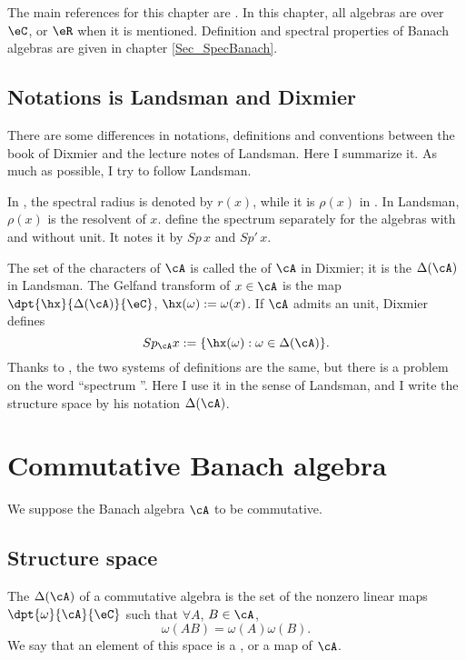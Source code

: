 
The main references for this chapter are \cite{Dixmier,Landsman}. In this chapter, all algebras are over $\eC$, or $\eR$ when it is mentioned. Definition and spectral properties of Banach algebras are given in chapter \ref{Sec_SpecBanach}.

\subsection*{Notations is Landsman and Dixmier}

There are some differences in notations, definitions and conventions between the book of Dixmier and the lecture notes of Landsman. Here I summarize it. As much as possible, I try to follow Landsman.

In , the spectral radius is denoted by $r(x)$, while it is $\rho(x)$ in . In Landsman, $\rho(x)$ is the resolvent of $x$.  define the spectrum separately for the algebras with and without unit. It notes it by $Sp\,x$ and $Sp'\,x$.

The set of the characters of $\cA$ is called the  of $\cA$ in Dixmier; it is the $\Delta(\cA)$ in Landsman. The Gelfand transform of $x\in\cA$ is the map $\dpt{\hx}{\Delta(\cA)}{\eC}$, $\hx(\omega):=\omega(x)$. If $\cA$ admits an unit, Dixmier defines
\[
   Sp_{\cA}x:=\{\hx(\omega):\omega\in\Delta(\cA)\}.
\]
Thanks to , the two systems of definitions are the same, but there is a problem on the word ``spectrum ''. Here I use it in the sense of Landsman, and I write the structure space by his notation $\Delta(\cA)$.

\section{Commutative Banach algebra}

We suppose the Banach algebra $\cA$ to be commutative.

\subsection{Structure space}

\begin{definition}      \label{DefStructureSpaceDel}
    The  $\Delta(\cA)$ of a commutative algebra is the set of the nonzero linear maps $\dpt{\omega}{\cA}{\eC}$ such that $\forall A$, $B\in\cA$,
\[
    \omega(AB)=\omega(A)\omega(B).
\]
We say that an element of this space is a , or a  map of $\cA$.
\end{definition}

